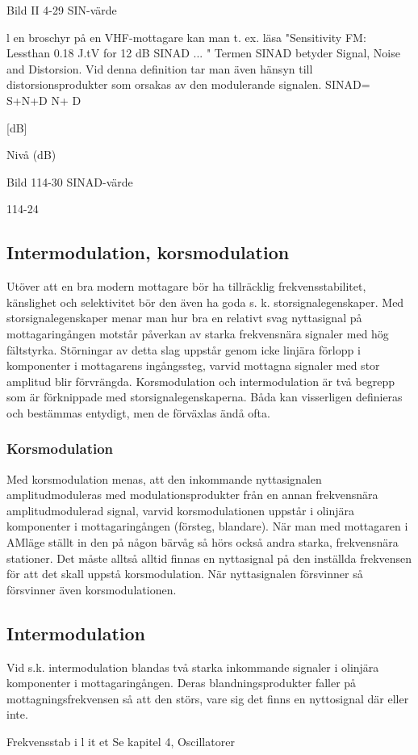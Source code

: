 Bild II 4-29 SIN-värde

l en broschyr på en VHF-mottagare kan
man t. ex. läsa "Sensitivity FM: Lessthan
0.18 J.tV for 12 dB SINAD ... "
Termen SINAD betyder Signal, Noise
and Distorsion. Vid denna definition tar man
även hänsyn till distorsionsprodukter som
orsakas av den modulerande signalen.
SINAD= S+N+D
N+ D

[dB]

Nivå
(dB)

Bild 114-30 SINAD-värde

114-24

\subsection{Intermodulation, korsmodulation}

Utöver att en bra modern mottagare bör ha
tillräcklig frekvensstabilitet, känslighet och
selektivitet bör den även ha goda s. k. storsignalegenskaper.
Med storsignalegenskaper menar man
hur bra en relativt svag nyttasignal på mottagaringången motstår påverkan av starka
frekvensnära signaler med hög fältstyrka.
Störningar av detta slag uppstår genom icke
linjära förlopp i komponenter i mottagarens
ingångssteg, varvid mottagna signaler med
stor amplitud blir förvrängda.
Korsmodulation och intermodulation är
två begrepp som är förknippade med storsignalegenskaperna. Båda kan visserligen
definieras och bestämmas entydigt, men de
förväxlas ändå ofta.

\subsubsection{Korsmodulation}
Med korsmodulation menas, att den inkommande nyttasignalen amplitudmoduleras
med modulationsprodukter från en annan
frekvensnära amplitudmodulerad signal,
varvid korsmodulationen uppstår i olinjära
komponenter i mottagaringången (försteg,
blandare). När man med mottagaren i AMläge ställt in den på någon bärvåg så hörs
också andra starka, frekvensnära stationer.
Det måste alltså alltid finnas en nyttasignal på den inställda frekvensen för att det
skall uppstå korsmodulation. När nyttasignalen försvinner så försvinner även korsmodulationen.

\subsection{Intermodulation}
Vid s.k. intermodulation blandas två starka
inkommande signaler i olinjära komponenter
i mottagaringången. Deras blandningsprodukter faller på mottagningsfrekvensen
så att den störs, vare sig det finns en nyttosignal där eller inte.

Frekvensstab i l it et
Se kapitel 4, Oscillatorer


